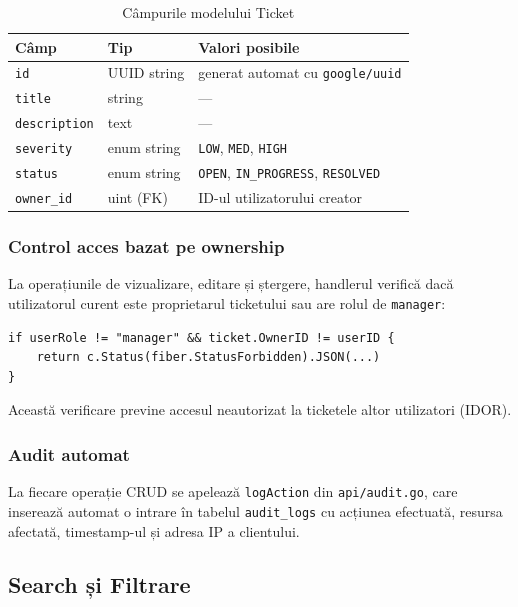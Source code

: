 \documentclass[12pt]{article}
\begin{document}
\begin{table}[H]
\centering
\begin{tabular}{|l|l|l|}
\hline
\textbf{Câmp} & \textbf{Tip} & \textbf{Valori posibile} \\
\hline
\texttt{id}          & UUID string   & generat automat cu \texttt{google/uuid} \\
\texttt{title}       & string        & --- \\
\texttt{description} & text          & --- \\
\texttt{severity}    & enum string   & \texttt{LOW}, \texttt{MED}, \texttt{HIGH} \\
\texttt{status}      & enum string   & \texttt{OPEN}, \texttt{IN\_PROGRESS}, \texttt{RESOLVED} \\
\texttt{owner\_id}   & uint (FK)     & ID-ul utilizatorului creator \\
\hline
\end{tabular}
\caption{Câmpurile modelului Ticket}
\end{table}

\subsubsection*{Control acces bazat pe ownership}

La operațiunile de vizualizare, editare și ștergere, handlerul verifică dacă utilizatorul
curent este proprietarul ticketului sau are rolul de \texttt{manager}:

\begin{verbatim}
if userRole != "manager" && ticket.OwnerID != userID {
    return c.Status(fiber.StatusForbidden).JSON(...)
}
\end{verbatim}

Această verificare previne accesul neautorizat la ticketele altor utilizatori (IDOR).

\subsubsection*{Audit automat}

La fiecare operație CRUD se apelează \texttt{logAction} din \texttt{api/audit.go},
care inserează automat o intrare în tabelul \texttt{audit\_logs} cu acțiunea efectuată,
resursa afectată, timestamp-ul și adresa IP a clientului.

\subsection{Search și Filtrare}
\end{document}
